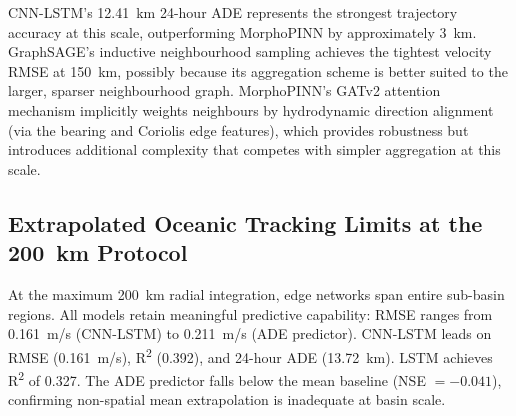 \documentclass[conference]{IEEEtran}
\begin{document}
CNN-LSTM's 12.41~km 24-hour ADE represents the strongest trajectory accuracy at this scale, outperforming MorphoPINN by approximately 3~km. GraphSAGE's inductive neighbourhood sampling achieves the tightest velocity RMSE at 150~km, possibly because its aggregation scheme is better suited to the larger, sparser neighbourhood graph. MorphoPINN's GATv2 attention mechanism implicitly weights neighbours by hydrodynamic direction alignment (via the bearing and Coriolis edge features), which provides robustness but introduces additional complexity that competes with simpler aggregation at this scale.

\subsection{Extrapolated Oceanic Tracking Limits at the 200~km Protocol}

\begin{table}[htbp]
\caption{Trajectory Divergence at the 200~km Max Spatial Protocol Limit}
\label{tab:200km}
\begin{center}
\end{center}
\end{table}

At the maximum 200~km radial integration, edge networks span entire sub-basin regions. All models retain meaningful predictive capability: RMSE ranges from 0.161~m/s (CNN-LSTM) to 0.211~m/s (ADE predictor). CNN-LSTM leads on RMSE (0.161~m/s), R\textsuperscript{2} (0.392), and 24-hour ADE (13.72~km). LSTM achieves R\textsuperscript{2} of 0.327. The ADE predictor falls below the mean baseline (NSE $= -0.041$), confirming non-spatial mean extrapolation is inadequate at basin scale.
\end{document}
